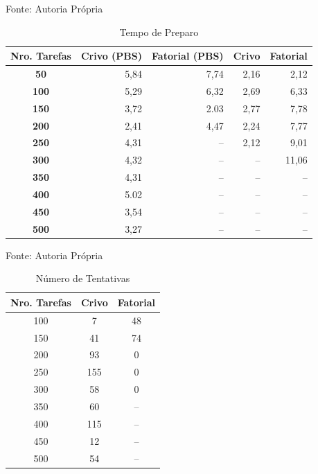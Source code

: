 \begin{table}[hbtp]
\begin{center}
\caption{Tempo de Preparo}
\label{tab:tempo_preparo}
\begin{center}
Fonte: Autoria Própria
\end{center}
\begin{tabular}{c|r|r|r|r}
	\hline
		{\bf Nro. Tarefas } & {\bf Crivo (PBS)} & {\bf Fatorial (PBS)} & {\bf Crivo} & {\bf Fatorial}\\
	\hline
	{\bf 50} & 5,84 & 7,74 & 2,16 & 2,12\\ \hline
	{\bf 100} & 5,29 & 6,32 & 2,69 & 6,33\\ \hline
	{\bf 150} & 3,72 & 2.03 & 2,77 & 7,78\\ \hline
	{\bf 200} & 2,41 & 4,47 & 2,24 & 7,77\\ \hline
	{\bf 250} & 4,31 & -- & 2,12 & 9,01\\ \hline
	{\bf 300} & 4,32 & -- & -- & 11,06\\ \hline
	{\bf 350} & 4,31 & -- & -- & --\\ \hline
	{\bf 400} & 5.02 & -- & -- & --\\ \hline
	{\bf 450} & 3,54 & -- & -- & --\\ \hline
	{\bf 500} & 3,27 & -- & -- & --\\ \hline
\end{tabular}
\end{center}
\end{table}

\begin{table}[hbtp]
\begin{center}
\caption{Número de Tentativas}
\label{tab:tentativas}
\begin{center}
Fonte: Autoria Própria
\end{center}
\begin{tabular}{c|c|c}
	\hline
		{\bf Nro. Tarefas } & {\bf Crivo } & {\bf Fatorial }\\
	\hline
	100 & 7 & 48\\ \hline
	150 & 41 & 74\\ \hline
	200 & 93 & 0\\ \hline
	250 & 155 & 0\\ \hline
	300 & 58 & 0\\ \hline
	350 & 60 & --\\ \hline
	400 & 115 & --\\ \hline
	450 & 12 & --\\ \hline
	500 & 54 & --\\ \hline
\end{tabular}
\end{center}
\end{table}

